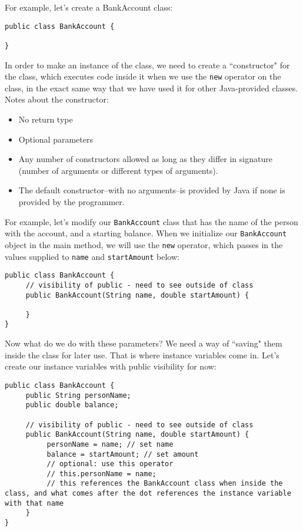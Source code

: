 \par For example, let's create a BankAccount class:
\begin{lstlisting}
public class BankAccount {
	
}
\end{lstlisting}
In order to make an instance of the class, we need to create a ``constructor" for the class, which executes code inside it when we use the \verb|new| operator on the class, in the exact same way that we have used it for other Java-provided classes. Notes about the constructor:
\begin{itemize}
\item No return type
\item Optional parameters
\item Any number of constructors allowed as long as they differ in signature (number of arguments or different types of arguments).
\item The default constructor--with no arguments--is provided by Java if none is provided by the programmer.
\end{itemize}
For example, let's modify our \verb|BankAccount| class that has the name of the person with the account, and a starting balance. When we initialize our \verb|BankAccount| object in the main method, we will use the \verb|new| operator, which passes in the values supplied to \verb|name| and \verb|startAmount| below:
\begin{lstlisting}
public class BankAccount {
     // visibility of public - need to see outside of class	
     public BankAccount(String name, double startAmount) {
	
     }
}
\end{lstlisting}
Now what do we do with these parameters? We need a way of ``saving" them inside the class for later use. That is where instance variables come in. Let's create our instance variables with public visibility for now:
\begin{lstlisting}
public class BankAccount {
     public String personName;
     public double balance;
     
     // visibility of public - need to see outside of class	
     public BankAccount(String name, double startAmount) {
          personName = name; // set name
          balance = startAmount; // set amount
          // optional: use this operator
          // this.personName = name;
          // this references the BankAccount class when inside the class, and what comes after the dot references the instance variable with that name
     }
}
\end{lstlisting}
